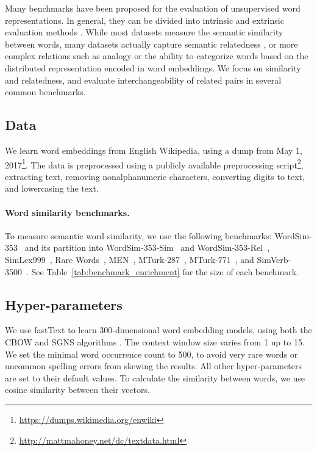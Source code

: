\documentclass[11pt,a4paper]{article}
\begin{document}
    Many benchmarks have been proposed for the evaluation of unsupervised word
    representations.
    In general, they can be divided into intrinsic and extrinsic evaluation methods
    \cite{schnabel2015evaluation,chiu2016intrinsic,jastrzebski2017evaluate,alshargi2018concept2vec,bakarov2018survey}.
    While most datasets measure the semantic similarity between words,
    many datasets actually capture semantic relatedness
    \cite{hill2015simlex,avraham2016improving},
    or more complex relations such as analogy or the ability to categorize
    words based on the distributed representation encoded in word embeddings.
    We focus on similarity and relatedness, and evaluate interchangeability
    of related pairs in several common benchmarks.
    
    \subsection{Data}\label{sec:data}
    We learn word embeddings from English Wikipedia,
    using a dump from May 1, 2017\footnote{\url{https://dumps.wikimedia.org/enwiki}}.
    The data is preprocessed using a publicly available preprocessing
    script\footnote{\url{http://mattmahoney.net/dc/textdata.html}},
    extracting text, removing nonalphanumeric characters,
    converting digits to text, and lowercasing the text.
    
    \paragraph{Word similarity benchmarks.}
    
    To measure semantic word similarity, we use the following benchmarks:
     WordSim-353~\cite{finkelstein2001placing} and its partition into
     WordSim-353-Sim~\cite{agirre2009study} and
     WordSim-353-Rel~\cite{zesch2008using},
     SimLex999~\cite{hill2015simlex},
     Rare Words~\cite[RW; ][]{luong2013better},
     MEN~\cite{bruni2012distributional},
     MTurk-287~\cite{radinsky2011word},
     MTurk-771~\cite{halawi2012large}, and
     SimVerb-3500~\cite{Gerz2016emnlp}.
    See Table~\ref{tab:benchmark_enrichment} for the size of each benchmark.
    
    \subsection{Hyper-parameters}\label{sec:hyperparams}
    We use fastText \cite{bojanowski2016enriching} to learn
    300-dimensional word embedding models,
    using both the CBOW and SGNS algorithms \cite{mikolov2013efficient}.
    The context window size varies from 1 up to 15.
    We set the minimal word occurrence count to 500, to avoid
    very rare words or uncommon spelling errors from skewing the results.
    All other hyper-parameters are set to their default values.
    To calculate the similarity between words, we use cosine similarity
    between their vectors.
    
\end{document}
